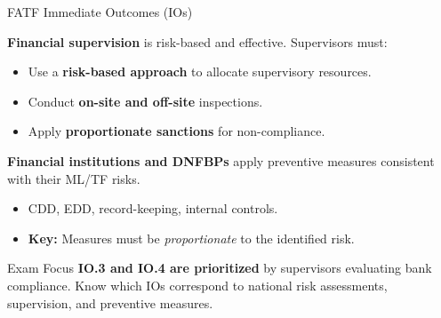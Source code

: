 \documentclass{beamer}
\begin{document}
	\begin{frame}{FATF Immediate Outcomes (IOs)}
		\begin{definition}
			\textbf{Financial supervision} is risk-based and effective. Supervisors must:
			\begin{itemize}
				\item Use a \textbf{risk-based approach} to allocate supervisory resources.
				\item Conduct \textbf{on-site and off-site} inspections.
				\item Apply \textbf{proportionate sanctions} for non-compliance.
			\end{itemize}
		\end{definition}
		\begin{definition}
			\textbf{Financial institutions and DNFBPs} apply preventive measures consistent with their ML/TF risks.
			\begin{itemize}
				\item CDD, EDD, record-keeping, internal controls.
				\item \textbf{Key:} Measures must be \textit{proportionate} to the identified risk.
			\end{itemize}
		\end{definition}
		\begin{alertblock}{Exam Focus}
			\textbf{IO.3 and IO.4 are prioritized} by supervisors evaluating bank compliance. Know which IOs correspond to national risk assessments, supervision, and preventive measures.
		\end{alertblock}
	\end{frame}
	
\end{document}

